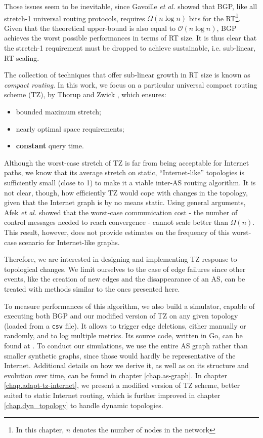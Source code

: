 \documentclass[a4paper,11pt,oneside]{report}
\begin{document}
\bigskip
Those issues seem to be inevitable, since Gavoille \textit{et al.} \cite{gavoilleMemoryRequirementRouting1996} showed that BGP, like all stretch-1 universal routing protocols, requires $\Omega(n\log n)$ bits for the RT\footnote{In this chapter, $n$ denotes the number of nodes in the network}. Given that the theoretical upper-bound is also equal to $\mathcal{O}(n\log n)$, BGP achieves the worst possible performances in terms of RT size. It is thus clear that the stretch-1 requirement must be dropped to achieve sustainable, i.e. sub-linear, RT scaling.

The collection of techniques that offer sub-linear growth in RT size is known as \emph{compact routing}.
In this work, we focus on a particular universal compact routing scheme (TZ), by Thorup and Zwick \cite{thorupApproximateDistanceOracles2005}, which ensures:
\begin{itemize}
\item bounded maximum stretch;
\item nearly optimal space requirements;
\item \textbf{constant} query time.
\end{itemize}

Although the worst-case stretch of TZ is far from being acceptable for Internet paths, we know \cite{krioukovCompactRoutingInternet2007} that its average stretch on static, ``Internet-like'' topologies is sufficiently small (close to 1) to make it a viable inter-AS routing algorithm. It is not clear, though, how efficiently TZ would cope with changes in the topology, given that the Internet graph is by no means static. Using general arguments, Afek \textit{et al.} \cite{afekUpperLowerBounds1989} showed that the worst-case communication cost - the number of control messages needed to reach convergence - cannot scale better than $\Omega(n)$.
This result, however, does not provide estimates on the frequency of this worst-case scenario for Internet-like graphs.

\bigskip
Therefore, we are interested in designing and implementing TZ response to topological changes. We limit ourselves to the case of edge failures since other events, like the creation of new edges and the disappearance of an AS, can be treated with methods similar to the ones presented here.

To measure performances of this algorithm, we also build a simulator, capable of executing both BGP and our modified version of TZ on any given topology (loaded from a \texttt{csv} file). It allows to trigger edge deletions, either manually or randomly, and to log multiple metrics. Its source code, written in Go, can be found at \cite{RoutingAlgorithmsSimulator}. To conduct our simulations, we use the entire AS graph rather than smaller synthetic graphs, since those would hardly be representative of the Internet. Additional details on how we derive it, as well as on its structure and evolution over time, can be found in chapter \ref{chap.as-graph}.
In chapter \ref{chap.adapt-tz-internet}, we present a modified version of TZ scheme, better suited to static Internet routing, which is further improved in chapter \ref{chap.dyn_topology} to handle dynamic topologies.
\end{document}
